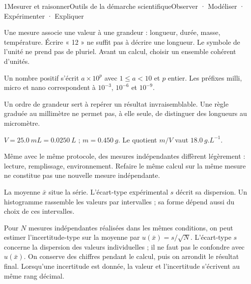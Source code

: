 \begin{ouverture}[mesure]{1}{Mesurer et raisonner}{Outils de la démarche scientifique}{Observer · Modéliser · Expérimenter · Expliquer}
\end{ouverture}
\essentiel
{}
Une mesure associe une valeur à une grandeur : longueur, durée, masse, température. Écrire « 12 » ne suffit pas à décrire une longueur. Le symbole de l'unité ne prend pas de pluriel. Avant un calcul, choisir un ensemble cohérent d'unités.
\begin{definition}Un nombre positif s'écrit $a\times10^p$ avec $1\leq a<10$ et $p$ entier. Les préfixes milli, micro et nano correspondent à $10^{-3}$, $10^{-6}$ et $10^{-9}$.\end{definition}
Un ordre de grandeur sert à repérer un résultat invraisemblable. Une règle graduée au millimètre ne permet pas, à elle seule, de distinguer des longueurs au micromètre.
\begin{exemple}$V=\qty{25,0}{mL}=\qty{0,0250}{L}$ ; $m=\qty{0,450}{g}$. Le quotient $m/V$ vaut $\qty{18,0}{g.L^{-1}}$.\end{exemple}
Même avec le même protocole, des mesures indépendantes diffèrent légèrement : lecture, remplissage, environnement. Refaire le même calcul sur la même mesure ne constitue pas une nouvelle mesure indépendante.
\begin{definition}La moyenne $\bar x$ situe la série. L'écart-type expérimental $s$ décrit sa dispersion. Un histogramme rassemble les valeurs par intervalles ; sa forme dépend aussi du choix de ces intervalles.\end{definition}
Pour $N$ mesures indépendantes réalisées dans les mêmes conditions, on peut estimer l'incertitude-type sur la moyenne par $u(\bar x)=s/\sqrt N$. L'écart-type $s$ concerne la dispersion des valeurs individuelles ; il ne faut pas le confondre avec $u(\bar x)$.
On conserve des chiffres pendant le calcul, puis on arrondit le résultat final. Lorsqu'une incertitude est donnée, la valeur et l'incertitude s'écrivent au même rang décimal.
